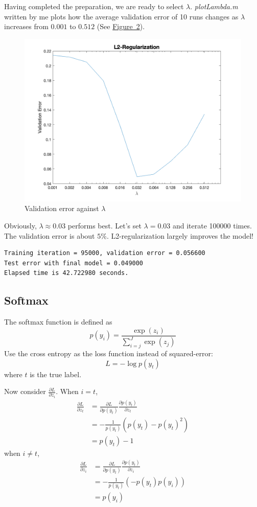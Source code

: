 \documentclass{article}
\begin{document}
Having completed the preparation, we are ready to select $\lambda$. \emph{plotLambda.m} written by me plots how the average validation error of 10 runs changes as $\lambda$ increases from $0.001$ to $0.512$ (See \hyperref[fig-2]{Figure~2}).

\begin{figure}
	\centering
	\includegraphics[scale=0.3]{2.png}
	\caption{Validation error against $\lambda$}
	\label{fig-2}
\end{figure}

Obviously, $\lambda \approx 0.03$ performs best. Let's set $\lambda = 0.03$ and iterate 100000 times. The validation error is about $5\%$. L2-regularization largely improves the model!

\begin{verbatim}
Training iteration = 95000, validation error = 0.056600
Test error with final model = 0.049000
Elapsed time is 42.722980 seconds.
\end{verbatim}

\subsection{Softmax}
The softmax function is defined as
\[
p(y_i) = \frac{\exp(z_i)}{\sum_{i=j}^J \exp(z_j)}
\]
Use the cross entropy as the loss function instead of squared-error:
\[
L = -\log p(y_t)
\]
where $t$ is the true label.

Now consider $\frac{\partial L}{\partial z_i}$. When $i = t$,
\begin{align*}
\frac{\partial L}{\partial z_t} &= \frac{\partial L}{\partial p(y_t)} \frac{\partial p(y_t)}{\partial z_t} \\
&= -\frac{1}{p(y_t)} \left( p(y_t) - p(y_t)^2 \right) \\
&= p(y_t) -1
\end{align*}
when $i \ne t$,
\begin{align*}
\frac{\partial L}{\partial z_i} &= \frac{\partial L}{\partial p(y_t)} \frac{\partial p(y_t)}{\partial z_i} \\
&= -\frac{1}{p(y_t)} \left( -p(y_t) p(y_i) \right) \\
&= p(y_i)
\end{align*}
\end{document}
